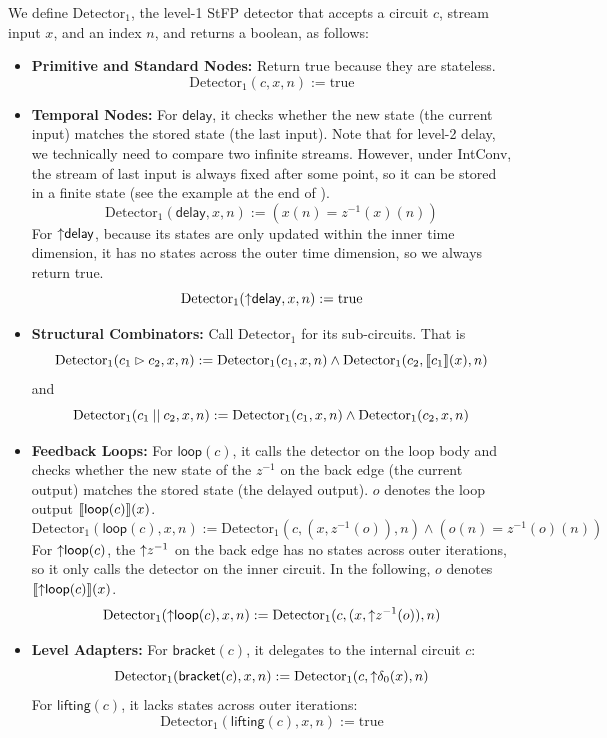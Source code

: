 \begin{definition}
    We define $\text{Detector}_1$, the level-1 StFP detector that accepts a circuit $c$, stream input $x$, and an index $n$, and returns a boolean, as follows:
    \begin{itemize}
        \item \textbf{Primitive and Standard Nodes:} Return true because they are stateless. 
        \[\text{Detector}_1(c, x, n) := \text{true}\]
        \item \textbf{Temporal Nodes:} For $\mathsf{delay}$, it checks whether the new state (the current input) matches the stored state (the last input). Note that for level-2 delay, we technically need to compare two infinite streams. However, under IntConv, the stream of last input is always fixed after some point, so it can be stored in a finite state (see the example at the end of ).
        \[\text{Detector}_1(\mathsf{delay}, x, n) := (x(n) = z^{-1}(x)(n))\] 
        For $\mathsf{{\uparrow}delay}$, because its states are only updated within the inner time dimension, it has no states across the outer time dimension, so we always return true.
        \[\text{Detector}_1(\mathsf{{\uparrow}delay}, x, n) := \text{true}\]
        \item \textbf{Structural Combinators:} Call $\text{Detector}_1$ for its sub-circuits. That is 
        \[\text{Detector}_1(c_1 \mathbin{\vartriangleright} c_2, x, n) := \text{Detector}_1(c_1, x, n) \land \text{Detector}_1(c_2, \llbracket c_1 \rrbracket(x), n)\] 
        and 
        \[\text{Detector}_1(c_1 \mathbin{||} c_2, x, n) := \text{Detector}_1(c_1, x, n) \land \text{Detector}_1(c_2, x, n)\]
        \item \textbf{Feedback Loops:} For $\mathsf{loop}(c)$, it calls the detector on the loop body and checks whether the new state of the $z^{-1}$ on the back edge (the current output) matches the stored state (the delayed output). $o$ denotes the loop output $\llbracket \mathsf{loop}(c) \rrbracket(x)$.
        \[
            \text{Detector}_1(\mathsf{loop}(c), x, n) :=
            \text{Detector}_1(c, (x, z^{-1}(o)), n) \land (o(n) = z^{-1}(o)(n))
        \] 
        For $\mathsf{{\uparrow}loop}(c)$, the ${\uparrow}z^{-1}$ on the back edge has no states across outer iterations, so it only calls the detector on the inner circuit. In the following, $o$ denotes $ \llbracket \mathsf{{\uparrow}loop}(c) \rrbracket(x)$.
        \[\text{Detector}_1(\mathsf{{\uparrow}loop}(c), x, n) := \text{Detector}_1(c, (x, {\uparrow}z^{-1}(o)), n)\]
        \item \textbf{Level Adapters:} For $\mathsf{bracket}(c)$, it delegates to the internal circuit $c$: 
        \[\text{Detector}_1(\mathsf{bracket}(c), x, n) := \text{Detector}_1(c, {\uparrow}\delta_0(x), n)\]
        For $\mathsf{lifting}(c)$, it lacks states across outer iterations: 
        \[\text{Detector}_1(\mathsf{lifting}(c), x, n) := \text{true}\]
    \end{itemize}


\end{definition}
